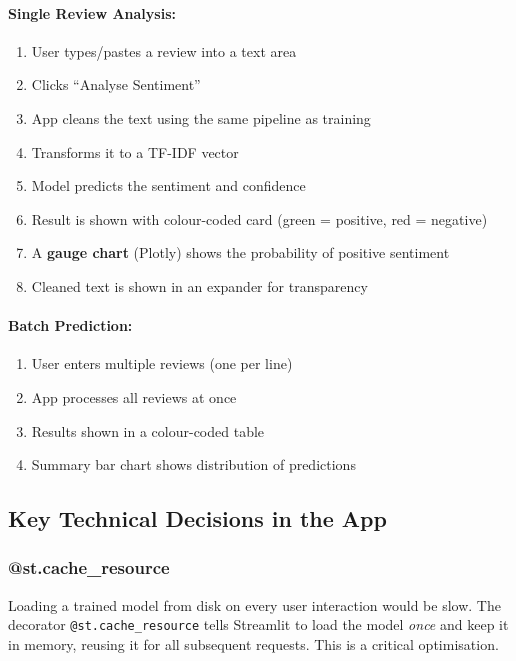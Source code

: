 \documentclass[12pt, a4paper]{article}
\begin{document}
\paragraph{Single Review Analysis:}
\begin{enumerate}
  \item User types/pastes a review into a text area
  \item Clicks ``Analyse Sentiment''
  \item App cleans the text using the same pipeline as training
  \item Transforms it to a TF-IDF vector
  \item Model predicts the sentiment and confidence
  \item Result is shown with colour-coded card (\textcolor{positive}{green} = positive, \textcolor{negative}{red} = negative)
  \item A \textbf{gauge chart} (Plotly) shows the probability of positive sentiment
  \item Cleaned text is shown in an expander for transparency
\end{enumerate}

\paragraph{Batch Prediction:}
\begin{enumerate}
  \item User enters multiple reviews (one per line)
  \item App processes all reviews at once
  \item Results shown in a colour-coded table
  \item Summary bar chart shows distribution of predictions
\end{enumerate}

\subsection{Key Technical Decisions in the App}

\subsubsection{@st.cache\_resource}

Loading a trained model from disk on every user interaction would be slow. The decorator \texttt{@st.cache\_resource} tells Streamlit to load the model \emph{once} and keep it in memory, reusing it for all subsequent requests. This is a critical optimisation.
\end{document}
